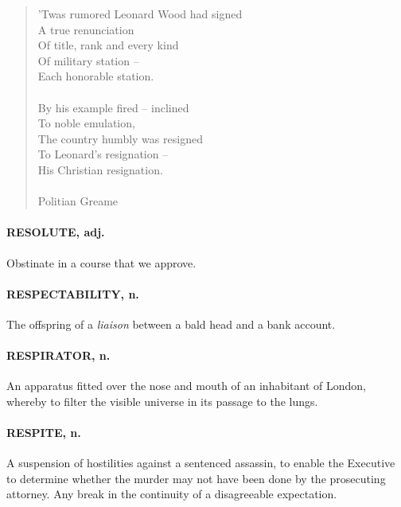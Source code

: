 \documentclass[11pt]{article}
\begin{document}
\begin{quote}   'Twas rumored Leonard Wood had signed \\
      A true renunciation \\
  Of title, rank and every kind \\
      Of military station -- \\
      Each honorable station. \\
 \\
  By his example fired -- inclined \\
      To noble emulation, \\
  The country humbly was resigned \\
      To Leonard's resignation -- \\
      His Christian resignation. \\
 \\
Politian Greame \end{quote}


\paragraph{RESOLUTE, adj.}  Obstinate in a course that we approve.

\paragraph{RESPECTABILITY, n.}  The offspring of a {\em liaison} between a bald head
and a bank account.

\paragraph{RESPIRATOR, n.}  An apparatus fitted over the nose and mouth of an
inhabitant of London, whereby to filter the visible universe in its
passage to the lungs.

\paragraph{RESPITE, n.}  A suspension of hostilities against a sentenced assassin,
to enable the Executive to determine whether the murder may not have
been done by the prosecuting attorney.  Any break in the continuity of
a disagreeable expectation.
\end{document}
